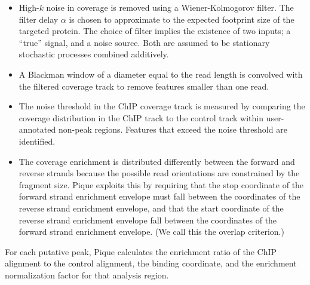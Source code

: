 \documentclass{bioinfo}
\begin{document}
\begin{methods}
\begin{itemize}
%

\item High-$k$ noise in coverage is removed using a Wiener-Kolmogorov
  filter. The filter delay $\alpha$ is chosen to approximate to the
  expected footprint size of the targeted protein. The choice of
  filter implies the existence of two inputs; a ``true'' signal, and a
  noise source. Both are assumed to be stationary stochastic processes
  combined additively.


\item A Blackman window of a diameter equal to the read length is
  convolved with the filtered coverage track to remove features
  smaller than one read. 

\item The noise threshold in the ChIP coverage track is measured by
  comparing the coverage distribution in the ChIP track to the control
  track within user-annotated non-peak regions. Features that exceed
  the noise threshold are identified.

\item The coverage enrichment is distributed differently between the
  forward and reverse strands because the possible read orientations
  are constrained by the fragment size. Pique exploits this by
  requiring that the stop coordinate of the forward strand enrichment
  envelope must fall between the coordinates of the reverse strand
  enrichment envelope, and that the start coordinate of the reverse
  strand enrichment envelope fall between the coordinates of the
  forward strand enrichment envelope. (We call this the overlap
  criterion.)

\end{itemize}


\noindent For each putative peak, Pique calculates the enrichment
ratio of the ChIP alignment to the control alignment, the binding
coordinate, and the enrichment normalization factor for that analysis
region. 

\end{methods}
\end{document}
